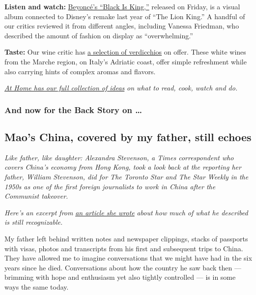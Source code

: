 \textbf{Listen and watch:}
\href{https://www.nytimes3xbfgragh.onion/2020/07/31/arts/music/beyonce-black-is-king.html}{Beyoncé's
``Black Is King,''} released on Friday, is a visual album connected to
Disney's remake last year of ``The Lion King.'' A handful of our critics
reviewed it from different angles, including Vanessa Friedman, who
described the amount of fashion on display as ``overwhelming.''

\textbf{Taste:} Our wine critic has
\href{https://www.nytimes3xbfgragh.onion/2020/07/30/dining/drinks/wine-school-verdicchio-di-matelica.html?action=click\&module=RelatedLinks\&pgtype=collection}{a
selection of verdicchios} on offer. These white wines from the Marche
region, on Italy's Adriatic coast, offer simple refreshment while also
carrying hints of complex aromas and flavors.

\href{https://www.nytimes3xbfgragh.onion/spotlight/at-home}{\emph{At
Home has our full collection of ideas}} \emph{on what to read, cook,
watch and do.}

\hypertarget{and-now-for-the-back-story-on-}{%
\subsubsection{And now for the Back Story on
\ldots{}}\label{and-now-for-the-back-story-on-}}

\hypertarget{maos-china-covered-by-my-father-still-echoes}{%
\subsection{Mao's China, covered by my father, still
echoes}\label{maos-china-covered-by-my-father-still-echoes}}

\emph{Like father, like daughter: Alexandra Stevenson, a Times
correspondent who covers China's economy from Hong Kong, took a look
back at the reporting her father, William Stevenson, did for The Toronto
Star and The Star Weekly in the 1950s as one of the first foreign
journalists to work in China after the Communist takeover.}

\emph{Here's an excerpt from}
\href{https://www.nytimes3xbfgragh.onion/interactive/2020/07/30/world/asia/china-1950s-echoed-today.html}{\emph{an
article she wrote}} \emph{about how much of what he described is still
recognizable.}

My father left behind written notes and newspaper clippings, stacks of
passports with visas, photos and transcripts from his first and
subsequent trips to China. They have allowed me to imagine conversations
that we might have had in the six years since he died. Conversations
about how the country he saw back then --- brimming with hope and
enthusiasm yet also tightly controlled --- is in some ways the same
today.

